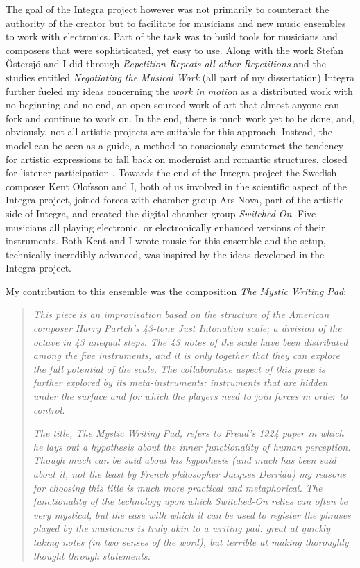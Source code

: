 \documentclass[a4paper]{article}
\begin{document}
The goal of the Integra project however was not primarily to counteract the authority of the creator but to facilitate for musicians and new music ensembles to work with electronics. Part of the task was to build tools for musicians and composers that were sophisticated, yet easy to use. Along with the work Stefan Östersjö and I did through \emph{Repetition Repeats all other Repetitions} and the studies entitled \emph{Negotiating the Musical Work} (all part of my dissertation) Integra further fueled my ideas concerning the \emph{work in motion} as a distributed work with no beginning and no end, an open sourced work of art that almost anyone can fork and continue to work on. In the end, there is much work yet to be done, and, obviously, not all artistic projects are suitable for this approach. Instead, the model can be seen as a guide, a method to consciously counteract the tendency for artistic expressions to fall back on modernist and romantic structures, closed for listener participation \citep[A collaborate paper on Repetition is in print along with a recording of a new version of the piece.][]{friskcoessens2013}. Towards the end of the Integra project the Swedish composer Kent Olofsson and I, both of us involved in the scientific aspect of the Integra project, joined forces with chamber group Ars Nova, part of the artistic side of Integra, and created the digital chamber group \emph{Switched-On}. Five musicians all playing electronic, or electronically enhanced versions of their instruments. Both Kent and I wrote music for this ensemble and the setup, technically incredibly advanced, was inspired by the ideas developed in the Integra project. 

My contribution to this ensemble was the composition \emph{The Mystic Writing Pad}: 

\begin{quote}
\emph{This piece is an improvisation based on the structure of the American composer Harry Partch's 43-tone Just Intonation scale; a division of the octave in 43 unequal steps. The 43 notes of the scale have been distributed among the five instruments, and it is only together that they can explore the full potential of the scale. The collaborative aspect of this piece is further explored by its meta-instruments: instruments that are hidden under the surface and for which the players need to join forces in order to control.}

\emph{The title, The Mystic Writing Pad, refers to Freud's 1924 paper in which he lays out a hypothesis about the inner functionality of human perception. Though much can be said about his hypothesis (and much has been said about it, not the least by French philosopher Jacques Derrida) my reasons for choosing this title is much more practical and metaphorical. The functionality of the technology upon which Switched-On relies can often be very mystical, but the ease with which it can be used to register the phrases played by the musicians is truly akin to a writing pad: great at quickly taking notes (in two senses of the word), but terrible at making thoroughly thought through statements.} \citep[][(Program note)]{frisk-mystic}
\end{quote}
\end{document}
